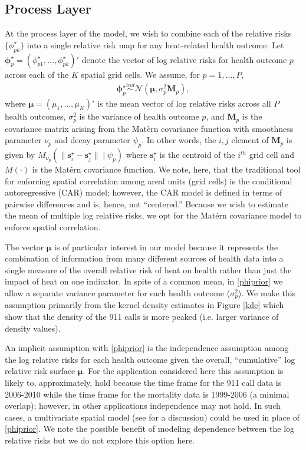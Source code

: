 \documentclass[final]{statsoc}
\begin{document}
\subsection{Process Layer}\label{process}
At the process layer of the model, we wish to combine each of the relative risks 
$\{\phi_{pk}^\star\}$ into a single relative risk map for any heat-related health outcome. 
Let $\boldsymbol{\phi}^\star_{p} = (\phi^\star_{p1}, \dots, 
\phi^\star_{pk})'$ denote the vector of log relative risks for health outcome 
$p$ across each of the $K$ spatial grid cells.  We assume, for $p=1,\dots,P$,
\begin{align} 
\boldsymbol{\phi}_p^\star \overset{ind}{\sim} \mathcal{N}\left(\boldsymbol\mu, \sigma^2_p\mathbf{M}_p\right),
\label{phiprior}
\end{align}
where $\boldsymbol{\mu} = (\mu_1,\dots,\mu_K)'$ is the mean vector of log relative risks
across all $P$ health outcomes, $\sigma^2_p$ is the variance of health outcome 
$p$, and $\mathbf{M}_p$ is the covariance matrix arising from the Mat\`{e}rn covariance 
function with smoothness parameter $\nu_p$ and decay parameter $\psi_p$. In other 
words, the $i,j$ element of $\mathbf{M}_p$ is given by $M_{\nu_p}(\|\mathbf{s}_i^\star - 
\mathbf{s}_j^\star\| \mid \psi_p)$ where $\mathbf{s}^\star_i$ is the centroid of the $i^{th}$ 
grid cell and $M(\cdot)$ is the Mat\'{e}rn covariance function.  We note, here, that 
the traditional tool for enforcing spatial correlation among areal units (grid cells) 
is the conditional autoregressive (CAR) model; however, the CAR model is defined in terms 
of pairwise differences and is, hence, not ``centered.''  Because we wish to estimate 
the mean of multiple log relative risks, we opt for the Mat\'{e}rn covariance model to 
enforce spatial correlation.

The vector $\boldsymbol\mu$ is of particular interest in our model because it represents
the combination of information from many different sources of health data into
a single measure of the overall relative risk of heat on 
health rather than just the impact of heat on one indicator. In spite of a common mean, 
in \eqref{phiprior} we allow a separate variance parameter for each health outcome 
($\sigma^2_p$). We make this assumption primarily from the kernel density estimates 
in Figure \ref{kde} which 
show that the density of the 911 calls is more peaked (i.e. larger variance of density values).

An implicit assumption with \eqref{phiprior} is the independence assumption among the log relative risks for each health outcome given the overall, ``cumulative'' log relative risk surface $\boldsymbol{\mu}$. For the application considered here this assumption is likely to, approximately, hold because the time frame for the 911 call data is 2006-2010 while the time frame for the mortality data is 1999-2006 (a minimal overlap); however, in other applications independence may not hold. In such cases, a multivariate spatial model (see \cite{Genton2015} for a discussion) could be used in place of \eqref{phiprior}. We note the possible benefit of modeling dependence between the log relative risks but we do not explore this option here.
\end{document}
